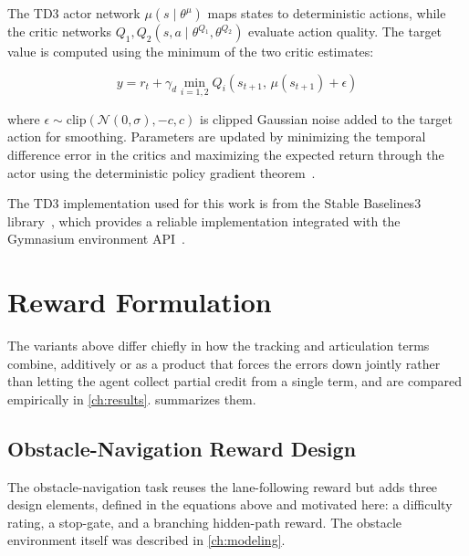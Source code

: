 The TD3 actor network $\mu(s \mid \theta^\mu)$ maps states to deterministic actions, while the critic networks $Q_1, Q_2(s, a \mid \theta^{Q_1}, \theta^{Q_2})$ evaluate action quality. The target value is computed using the minimum of the two critic estimates:

\begin{equation}
    y = r_t + \gamma_d \min_{i=1,2} Q_i(s_{t+1},\, \mu(s_{t+1}) + \epsilon)
    \label{eq:td3_target}
\end{equation}

where $\epsilon \sim \text{clip}(\mathcal{N}(0, \sigma), -c, c)$ is clipped Gaussian noise added to the target action for smoothing. Parameters are updated by minimizing the temporal difference error in the critics and maximizing the expected return through the actor using the deterministic policy gradient theorem~\cite{silver2014dpg}.

The TD3 implementation used for this work is from the Stable Baselines3 library~\cite{raffin2021sb3}, which provides a reliable implementation integrated with the Gymnasium environment API~\cite{towers2024gymnasium}.

\section{Reward Formulation}


The variants above differ chiefly in how the tracking and articulation terms combine, additively or as a product that forces the errors down jointly rather than letting the agent collect partial credit from a single term, and are compared empirically in \cref{ch:results}.  summarizes them.



\subsection{Obstacle-Navigation Reward Design}
\label{sec:obstacle_reward}

The obstacle-navigation task reuses the lane-following reward but adds three design elements, defined in the equations above and motivated here: a difficulty rating, a stop-gate, and a branching hidden-path reward. The obstacle environment itself was described in \cref{ch:modeling}.


